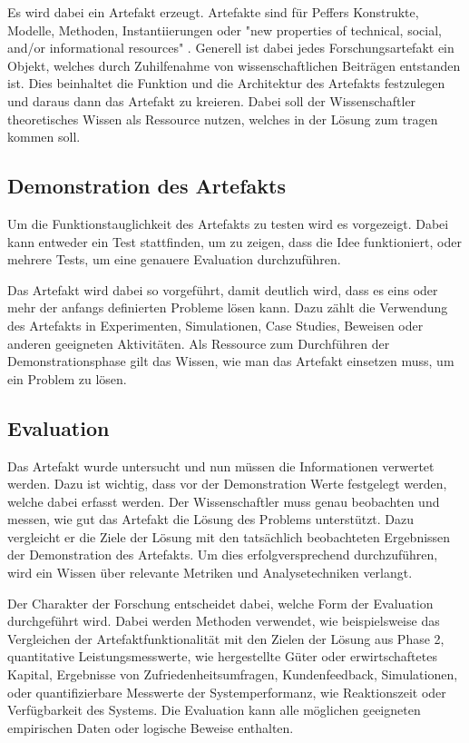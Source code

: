 Es wird dabei ein Artefakt erzeugt. Artefakte sind für Peffers Konstrukte, Modelle, Methoden, Instantiierungen oder "new properties of technical, social, and/or informational resources" \cite{jarvinen_action_2007}. Generell ist dabei jedes Forschungsartefakt ein Objekt, welches durch Zuhilfenahme von wissenschaftlichen Beiträgen entstanden ist. Dies beinhaltet die Funktion und die Architektur des Artefakts festzulegen und daraus dann das Artefakt zu kreieren. Dabei soll der Wissenschaftler theoretisches Wissen als Ressource nutzen, welches in der Lösung zum tragen kommen soll.

\subsection{Demonstration des Artefakts}

Um die Funktionstauglichkeit des Artefakts zu testen wird es vorgezeigt. Dabei kann entweder ein Test stattfinden, um zu zeigen, dass die Idee funktioniert, oder mehrere Tests, um eine genauere Evaluation durchzuführen.

Das Artefakt wird dabei so vorgeführt, damit deutlich wird, dass es eins oder mehr der anfangs definierten Probleme lösen kann. Dazu zählt die Verwendung des Artefakts in Experimenten, Simulationen, Case Studies, Beweisen oder anderen geeigneten Aktivitäten. Als Ressource zum Durchführen der Demonstrationsphase gilt das Wissen, wie man das Artefakt einsetzen muss, um ein Problem zu lösen.

\subsection{Evaluation}

Das Artefakt wurde untersucht und nun müssen die Informationen verwertet werden. Dazu ist wichtig, dass vor der Demonstration Werte festgelegt werden, welche dabei erfasst werden. Der Wissenschaftler muss genau beobachten und messen, wie gut das Artefakt die Lösung des Problems unterstützt. Dazu vergleicht er die Ziele der Lösung mit den tatsächlich beobachteten Ergebnissen der Demonstration des Artefakts. Um dies erfolgversprechend durchzuführen, wird ein Wissen über relevante Metriken und Analysetechniken verlangt.

Der Charakter der Forschung entscheidet dabei, welche Form der Evaluation durchgeführt wird. Dabei werden Methoden verwendet, wie beispielsweise das Vergleichen der Artefaktfunktionalität mit den Zielen der Lösung aus Phase 2, quantitative Leistungsmesswerte, wie hergestellte Güter oder erwirtschaftetes Kapital, Ergebnisse von Zufriedenheitsumfragen, Kundenfeedback, Simulationen, oder quantifizierbare Messwerte der Systemperformanz, wie Reaktionszeit oder Verfügbarkeit des Systems. Die Evaluation kann alle möglichen geeigneten empirischen Daten oder logische Beweise enthalten.

